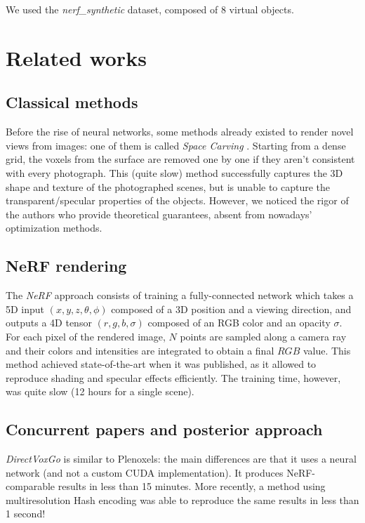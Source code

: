 \documentclass{article}
\begin{document}
We used the \textit{nerf\_synthetic} dataset, composed of 8 virtual objects.
\section{Related works}



\subsection{Classical methods}

Before the rise of neural networks, some methods already existed to render novel views from images: one of them is called \textit{Space Carving} \cite{spacecarving}. Starting from a dense grid, the voxels from the surface are removed one by one if they aren't consistent with every photograph. This (quite slow) method successfully captures the 3D shape and texture of the photographed scenes, but is unable to capture the transparent/specular properties of the objects. However, we noticed the rigor of the authors who provide theoretical guarantees, absent from nowadays' optimization methods.

\subsection{NeRF rendering}

The \textit{NeRF} \cite{nerf} approach consists of training a fully-connected network which takes a 5D input $(x,y,z,\theta,\phi)$ composed of a 3D position and a viewing direction, and outputs a 4D tensor $(r, g, b, \sigma)$ composed of an RGB color and an opacity $\sigma$. For each pixel of the rendered image, $N$ points are sampled along a camera ray and their colors and intensities are integrated to obtain a final $RGB$ value. This method achieved state-of-the-art when it was published, as it allowed to reproduce shading and specular effects efficiently. The training time, however, was quite slow (12 hours for a single scene).

\subsection{Concurrent papers and posterior approach}

\textit{DirectVoxGo} \cite{directvoxgo} is similar to Plenoxels: the main differences are that it uses a neural network (and not a custom CUDA implementation). It produces NeRF-comparable results in less than 15 minutes. More recently, a method using multiresolution Hash encoding \cite{instant} was able to reproduce the same results in less than 1 second!
\end{document}

